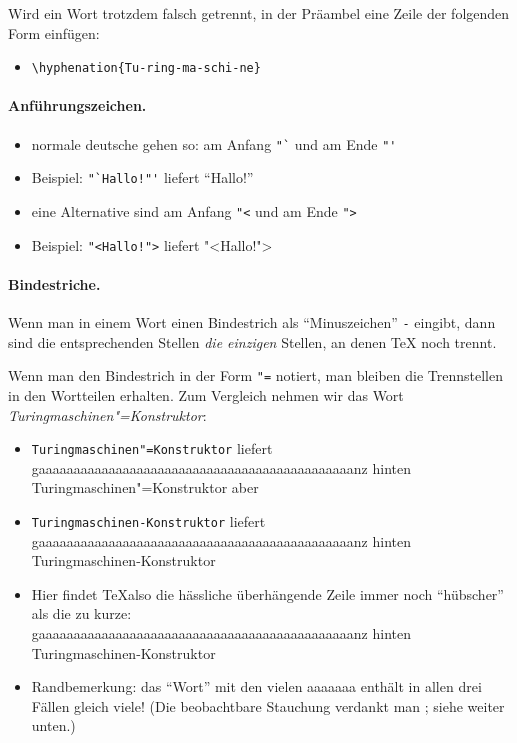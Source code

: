 Wird ein Wort trotzdem falsch getrennt, in der Präambel eine Zeile der
folgenden Form einfügen:
\begin{itemize}
\item \verb|\hyphenation{Tu-ring-ma-schi-ne}|
\end{itemize}

\paragraph{Anführungszeichen.}
%
\begin{itemize}[noitemsep]
\item normale deutsche gehen so: am Anfang \verb|"`| und am Ende \verb|"'|
\item Beispiel: \verb|"`Hallo!"'| liefert "`Hallo!"'
\item eine Alternative sind am Anfang \verb|"<| und am Ende \verb|">|
\item Beispiel: \verb|"<Hallo!">| liefert "<Hallo!">
\end{itemize}


\paragraph{Bindestriche.}

Wenn man in einem Wort einen Bindestrich als "`Minuszeichen"' \verb|-|
eingibt, dann sind die entsprechenden Stellen \emph{die einzigen} Stellen, an
denen \TeX{} noch trennt.

Wenn man den Bindestrich in der Form \verb|"=| notiert, man bleiben die
Trennstellen in den Wortteilen erhalten. Zum Vergleich nehmen wir das Wort
\emph{Turingmaschinen"=Konstruktor}:
\begin{itemize}
\item \verb|Turingmaschinen"=Konstruktor| liefert\\
  gaaaaaaaaaaaaaaaaaaaaaaaaaaaaaaaaaaaaaaaaaaaaanz hinten Turingmaschinen"=Konstruktor
  aber
\item  \verb|Turingmaschinen-Konstruktor| liefert\\
  gaaaaaaaaaaaaaaaaaaaaaaaaaaaaaaaaaaaaaaaaaaaaanz hinten Turingmaschinen-Konstruktor
\item
  Hier findet \TeX also die hässliche überhängende Zeile immer noch "`hübscher"'
  als die zu kurze:\\
  gaaaaaaaaaaaaaaaaaaaaaaaaaaaaaaaaaaaaaaaaaaaaanz hinten \\
  Turingmaschinen-Konstruktor
\item Randbemerkung: das "`Wort"' mit den vielen aaaaaaa enthält in allen drei
  Fällen gleich viele! (Die beobachtbare Stauchung verdankt man
  ; siehe weiter unten.)
\end{itemize}


